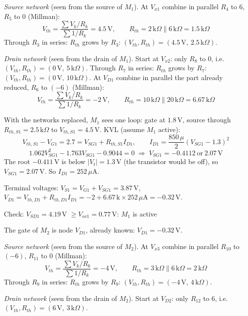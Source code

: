 \documentclass[11pt]{article}
\newcommand{\solstep}[2]{\par\medskip{\color{stepc}\textbf{Step #1 --- #2}}\par\nopagebreak}
\begin{document}
\emph{Source network} (seen from the source of $M_{1}$). At $V_{x1}$ combine in parallel $R_{4}$ to $6$, $R_{5}$ to $0$ (Millman): \[V_{th} = \frac{\sum V_k/R_k}{\sum 1/R_k} = 4.5\,\mathrm{V},\qquad R_{th} = 2\,\mathrm{k}\Omega \| 6\,\mathrm{k}\Omega = 1.5\,\mathrm{k}\Omega\] Through $R_{3}$ in series: $R_{th}$ grows by $R_{3}$: $(V_{th}, R_{th}) = (4.5\,\mathrm{V},\ 2.5\,\mathrm{k}\Omega)$.

\emph{Drain network} (seen from the drain of $M_{1}$). Start at $V_{x2}$: only $R_{8}$ to $0$, i.e. $(V_{th}, R_{th}) = (0\,\mathrm{V},\ 5\,\mathrm{k}\Omega)$. Through $R_{7}$ in series: $R_{th}$ grows by $R_{7}$: $(V_{th}, R_{th}) = (0\,\mathrm{V},\ 10\,\mathrm{k}\Omega)$. At $V_{D1}$ combine in parallel the part already reduced, $R_{6}$ to $(-6)$ (Millman): \[V_{th} = \frac{\sum V_k/R_k}{\sum 1/R_k} = -2\,\mathrm{V},\qquad R_{th} = 10\,\mathrm{k}\Omega \| 20\,\mathrm{k}\Omega = 6.67\,\mathrm{k}\Omega\]

With the networks replaced, $M_{1}$ sees one loop: gate at $1.8\,\mathrm{V}$, source through $R_{th,S1} = 2.5\,\mathrm{k}\Omega$ to $V_{th,S1} = 4.5\,\mathrm{V}$. KVL (assume $M_{1}$ active):\[V_{th,S1} - V_{G1} = 2.7 = V_{SG1} + R_{th,S1}I_{D1},\qquad I_{D1} = \frac{850\,\mu }{2}(V_{SG1} - 1.3)^2\]\[1.062V_{SG1}^2 - 1.763V_{SG1} - 0.9044 = 0 \;\Rightarrow\; V_{SG1} = -0.4112\ \text{or}\ 2.07\,\mathrm{V}\]The root $-0.411$\,V is below $|V_t| = 1.3$\,V (the transistor would be off), so $V_{SG1} = 2.07$\,V. So $I_{D1} = 252\,\mu \mathrm{A}$.

Terminal voltages: $V_{S1} = V_{G1} + V_{SG1} = 3.87\,\mathrm{V}$, $V_{D1} = V_{th,D1} + R_{th,D1}I_{D1} = -2 + 6.67\,\mathrm{k}\times252\,\mu \mathrm{A} = -0.32\,\mathrm{V}$.

Check: $V_{SD1} = 4.19$\,V $\ge V_{ov1} = 0.77$\,V: $M_{1}$ is active \checkmark
\solstep{3}{Transistor $M_{2}$}The gate of $M_{2}$ is node $V_{D1}$, already known: $V_{D1} = -0.32\,\mathrm{V}$.

\emph{Source network} (seen from the source of $M_{2}$). At $V_{x3}$ combine in parallel $R_{10}$ to $(-6)$, $R_{11}$ to $0$ (Millman): \[V_{th} = \frac{\sum V_k/R_k}{\sum 1/R_k} = -4\,\mathrm{V},\qquad R_{th} = 3\,\mathrm{k}\Omega \| 6\,\mathrm{k}\Omega = 2\,\mathrm{k}\Omega\] Through $R_{9}$ in series: $R_{th}$ grows by $R_{9}$: $(V_{th}, R_{th}) = (-4\,\mathrm{V},\ 4\,\mathrm{k}\Omega)$.

\emph{Drain network} (seen from the drain of $M_{2}$). Start at $V_{D2}$: only $R_{12}$ to $6$, i.e. $(V_{th}, R_{th}) = (6\,\mathrm{V},\ 3\,\mathrm{k}\Omega)$.
\end{document}
